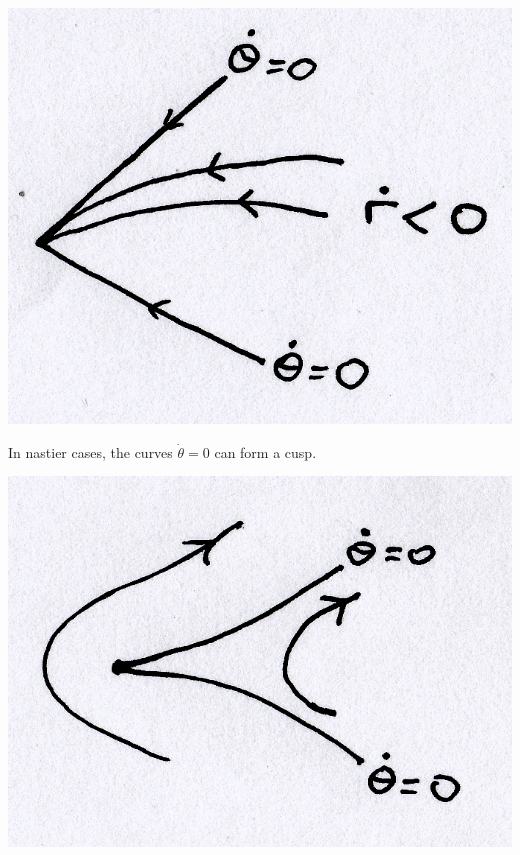\documentclass{article}
\begin{document}
\begin{enumerate}[(a)]
\begin{center}
\includegraphics[scale = 0.16]{fig18.png}
\end{center}
In nastier cases, the curves $\dot{\theta} = 0$ can form a cusp.
\begin{center}
\includegraphics[scale = 0.16]{fig19.png}
\end{center}
\end{enumerate}
%
%
\end{document}
